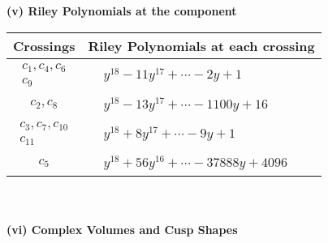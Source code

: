 \documentclass[1p]{elsarticle_modified}
\theoremstyle{definition}
\begin{document}
\newpage\renewcommand{\arraystretch}{1}
\flushleft \textbf{(v) Riley Polynomials at the component}\newline \\
\begin{tabular}{m{50pt}|m{274pt}}
Crossings & \hspace{64pt}Riley Polynomials at each crossing \\
\hline $$\begin{aligned}c_{1},c_{4},c_{6}\\c_{9}\end{aligned}$$&$\begin{aligned}
&y^{18}-11 y^{17}+\cdots-2 y+1
\end{aligned}$\\
\hline $$\begin{aligned}c_{2},c_{8}\end{aligned}$$&$\begin{aligned}
&y^{18}-13 y^{17}+\cdots-1100 y+16
\end{aligned}$\\
\hline $$\begin{aligned}c_{3},c_{7},c_{10}\\c_{11}\end{aligned}$$&$\begin{aligned}
&y^{18}+8 y^{17}+\cdots-9 y+1
\end{aligned}$\\
\hline $$\begin{aligned}c_{5}\end{aligned}$$&$\begin{aligned}
&y^{18}+56 y^{16}+\cdots-37888 y+4096
\end{aligned}$\\
\hline
\end{tabular}\\~\\
\newpage\flushleft \textbf{(vi) Complex Volumes and Cusp Shapes}
\end{document}
